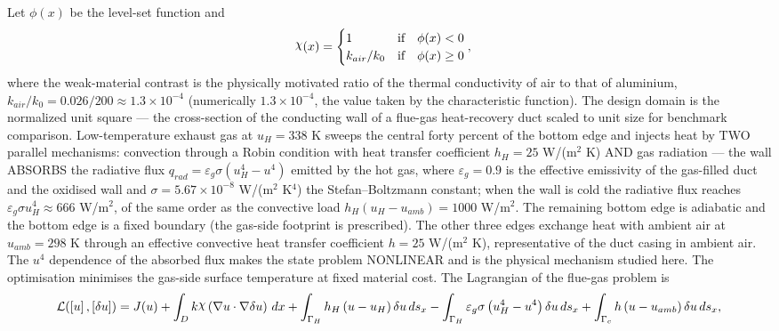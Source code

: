 \documentclass[preview]{standalone}
\let\oldcdot\cdot
\let\cdot\oldcdot
\begin{document}
Let $\phi(x)$ be the level-set function and
 \begin{align*}\raisebox{\depth}{$\chi$}(x) &= \begin{cases} 1 & \mbox{if}\quad \phi(x) < 0 \\ k_{air}/k_0 & \mbox{if}\quad \phi(x)  \ge 0 \end{cases},\end{align*}
where the weak-material contrast is the physically motivated ratio of the thermal conductivity of air to that of aluminium, $k_{air}/k_0 = 0.026/200 \approx 1.3 \times 10^{-4}$ (numerically $1.3 \times 10^{-4}$, the value taken by the characteristic function).
The design domain is the normalized unit square — the cross-section of the conducting wall of a flue-gas heat-recovery duct scaled to unit size for benchmark comparison.  Low-temperature exhaust gas at $u_H = 338$ K sweeps the central forty percent of the bottom edge and injects heat by TWO parallel mechanisms: convection through a Robin condition with heat transfer coefficient $h_H = 25$ W/(m$^{2}$ K) AND gas radiation — the wall ABSORBS the radiative flux $q_{rad} = \varepsilon_g \sigma \left( u_{H}^{4} - u^{4}\right)$ emitted by the hot gas, where $\varepsilon_g = 0.9$ is the effective emissivity of the gas-filled duct and the oxidised wall and $\sigma = 5.67 \times 10^{-8}$ W/(m$^{2}$ K$^{4}$) the Stefan--Boltzmann constant; when the wall is cold the radiative flux reaches $\varepsilon_g \sigma u_H^{4} \approx 666$ W/m$^{2}$, of the same order as the convective load $h_H\left(u_H - u_{amb}\right) = 1000$ W/m$^{2}$.  The remaining bottom edge is adiabatic and the bottom edge is a fixed boundary (the gas-side footprint is prescribed).  The other three edges exchange heat with ambient air at $u_{amb} = 298$ K through an effective convective heat transfer coefficient $h = 25$ W/(m$^{2}$ K), representative of the duct casing in ambient air.  The $u^{4}$ dependence of the absorbed flux makes the state problem NONLINEAR and is the physical mechanism studied here.  The optimisation minimises the gas-side surface temperature at fixed material cost.
The Lagrangian of the flue-gas problem is
\begin{dmath*}
\mathcal L(\left[ u\right],\left[ \delta u\right]) = J(u) +  \int_{D} k \raisebox{\depth}{$\chi$} \left(  \nabla u  \cdot  \nabla \delta u  \right) \,dx + \int_{\Gamma_H} h_H \left( u - u_{H}\right) \delta u \,ds_x - \int_{\Gamma_H} \varepsilon_g \sigma \left( u_{H}^{4} - u^{4}\right) \delta u \,ds_x + \int_{\Gamma_c} h \left( u - u_{amb}\right) \delta u \,ds_x ,
\end{dmath*}
\end{document}
